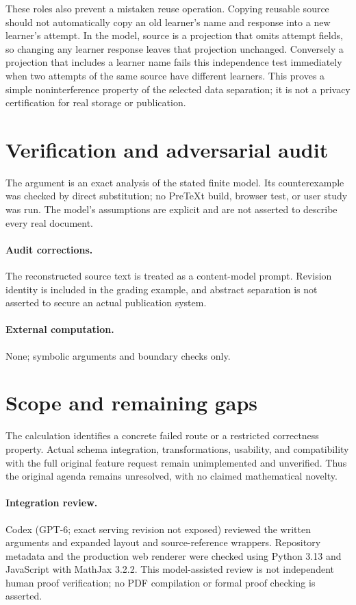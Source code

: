 \documentclass[11pt]{article}
\begin{document}
These roles also prevent a mistaken reuse operation. Copying reusable source should not automatically copy an old learner's name and response into a new learner's attempt. In the model, source is a projection that omits attempt fields, so changing any learner response leaves that projection unchanged. Conversely a projection that includes a learner name fails this independence test immediately when two attempts of the same source have different learners. This proves a simple noninterference property of the selected data separation; it is not a privacy certification for real storage or publication.
\section{Verification and adversarial audit}
The argument is an exact analysis of the stated finite model. Its counterexample was checked by direct substitution; no PreTeXt build, browser test, or user study was run. The model's assumptions are explicit and are not asserted to describe every real document.
\paragraph{Audit corrections.} The reconstructed source text is treated as a content-model prompt. Revision identity is included in the grading example, and abstract separation is not asserted to secure an actual publication system.
\paragraph{External computation.} None; symbolic arguments and boundary checks only.
\section{Scope and remaining gaps}
The calculation identifies a concrete failed route or a restricted correctness property. Actual schema integration, transformations, usability, and compatibility with the full original feature request remain unimplemented and unverified. Thus the original agenda remains unresolved, with no claimed mathematical novelty.
\paragraph{Integration review.} Codex (GPT-6; exact serving revision not exposed) reviewed the written arguments and expanded layout and source-reference wrappers. Repository metadata and the production web renderer were checked using Python 3.13 and JavaScript with MathJax 3.2.2. This model-assisted review is not independent human proof verification; no PDF compilation or formal proof checking is asserted.
\end{document}
